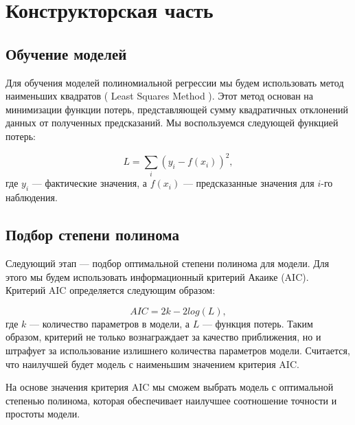 \chapter{Конструкторская часть}


\section{Обучение моделей}

Для обучения моделей полиномиальной регрессии мы будем использовать метод наименьших квадратов ( Least Squares Method ). Этот метод основан на минимизации функции потерь, представляющей сумму квадратичных отклонений данных от полученных предсказаний. Мы воспользуемся следующей функцией потерь:

\begin{equation}
L = \sum_{i}(y_i - f(x_i))^2,
\end{equation}
где  $y_i$ — фактические значения, а $f(x_i)$ — предсказанные значения для $i$-го наблюдения.


\section{Подбор степени полинома}

Следующий этап — подбор оптимальной степени полинома для модели. Для этого мы будем использовать информационный критерий Акаике (AIC). Критерий AIC определяется следующим образом:

\begin{equation}
AIC = 2k - 2log(L),
\end{equation}
где $k$ — количество параметров в модели, а $L$ — функция потерь. Таким образом, критерий не только вознаграждает за качество приближения, но и штрафует за использование излишнего количества параметров модели. Считается, что наилучшей будет модель с наименьшим значением критерия AIC.

На основе значения критерия AIC мы сможем выбрать модель с оптимальной степенью полинома, которая обеспечивает наилучшее соотношение точности и простоты модели.

\clearpage

